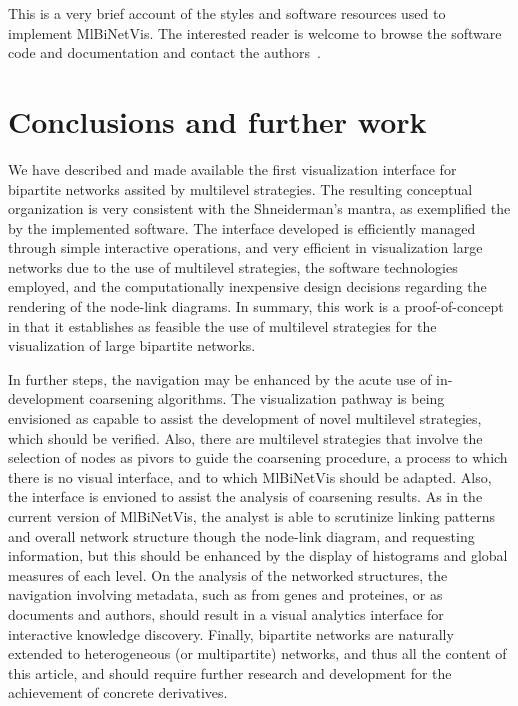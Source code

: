 \documentclass[runningheads]{llncs}
\begin{document}
This is a very brief account of the styles and software resources used to implement
MlBiNetVis. The interested reader is welcome to browse the software code and documentation
and contact the authors~\cite{mbvncode}.



\section{Conclusions and further work}\label{con}
We have described and made available the first visualization interface for bipartite networks
assited by multilevel strategies.
The resulting conceptual organization is very consistent with the Shneiderman's mantra,
as exemplified the by the implemented software.
The interface developed is efficiently managed through simple interactive operations,
and very efficient in visualization large networks due to the use of multilevel strategies,
the software technologies employed, and the computationally inexpensive design decisions regarding
the rendering of the node-link diagrams.
In summary, this work is a proof-of-concept in that it establishes as feasible the use
of multilevel strategies for the visualization of large bipartite networks.

In further steps, the navigation may be enhanced by the acute use of in-development coarsening algorithms.
The visualization pathway is being envisioned as capable to assist the development of novel
multilevel strategies, which should be verified.
Also, there are multilevel strategies that involve the selection of nodes as pivors
to guide the coarsening procedure, a process to which there is no visual interface,
and to which MlBiNetVis should be adapted.
Also, the interface is envioned to assist the analysis of coarsening results. As in the current version of MlBiNetVis,
the analyst is able to scrutinize linking patterns and overall network structure though the node-link diagram,
and requesting information, but this should be enhanced by the display of histograms and global measures of each level.
On the analysis of the networked structures, the navigation involving metadata, such as from genes and proteines, or as
documents and authors, should result in a visual analytics interface for interactive knowledge discovery.
Finally, bipartite networks are naturally extended to heterogeneous (or multipartite) networks,
and thus all the content of this article, and should require further research and development for the achievement
of concrete derivatives.
\end{document}
